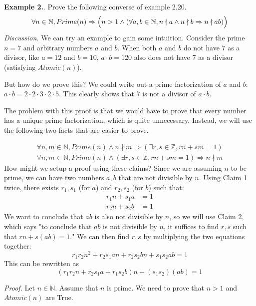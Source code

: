 \documentclass{article}
\newcounter{excount}
\newcommand\ex{\stepcounter{excount} \textbf{Example 2.\theexcount}. }
\begin{document}
\ex Prove the following converse of example 2.20.
$$\forall n \in \mathbb{N}, Prime(n) \Rightarrow \Bigl( n > 1 \land (
    \forall a, b \in \mathbb{N}, n \nmid a \land n \nmid b \Rightarrow n 
    \nmid ab) \Bigr) $$
\textit{Discussion.} We can try an example to gain some intuition. Consider 
the prime $n = 7$ and arbitrary numbers $a$ and $b$. When both $a$ and $b$ 
do not have 7 as a divisor, like $a = 12$ and $b = 10$, $a \cdot b =120$ 
also does not have 7 as a divisor (satisfying $Atomic(n)$). 

But how do we prove this? We could write out a prime factorization of 
$a$ and $b$: $a \cdot b = 2 \cdot 2 \cdot 3 \cdot 2 \cdot 5$. This clearly 
shows that 7 is not a divisor of $a \cdot b$.

The problem with this proof is that we would have to prove that every 
number has a unique prime factorization, which is quite unnecessary. 
Instead, we will use the following two facts that are easier to prove.

\newpage 
\begin{align*}
    \forall n, m \in \mathbb{N}, Prime(n) \land n \nmid m \Rightarrow 
    (\exists r, s \in \mathbb{Z}, rn + sm = 1)\tag*{(Claim 1)} \\
    \forall n, m \in \mathbb{N}, Prime(n) \land (\exists r, s \in \mathbb{Z}, 
    rn + sm = 1) \Rightarrow n \nmid m \tag*{(Claim 2)}
\end{align*}
How might we setup a proof using these claims? Since we are assuming $n$ to 
be prime, we can have two numbers $a, b$ that are not divisible by $n$. Using 
Claim 1 twice, there exists $r_1, s_1$ (for $a$) and $r_2, s_2$ (for $b$) 
such that:
\begin{align*}
    r_1n + s_1a &= 1 \\
    r_2n + s_2b &= 1
\end{align*}
We want to conclude that $ab$ is also not divisible by $n$, so we will use 
Claim 2, which says "to conclude that $ab$ is not divisible by $n$, it 
suffices to find $r, s$ such that $rn + s(ab) = 1$." We can then find $r, s$ 
by multiplying the two equations together:
$$r_1r_2n^2 + r_2s_1an + r_2s_2bn + s_1s_2ab = 1$$
This can be rewritten as 
$$(r_1r_2n + r_2s_1a + r_1s_2b)n + (s_1s_2) (ab) = 1$$

\textit{Proof.} Let $n \in \mathbb{N}$. Assume that $n$ is prime. We need to 
prove that $n > 1$ and $Atomic(n)$ are True. 
\end{document}
